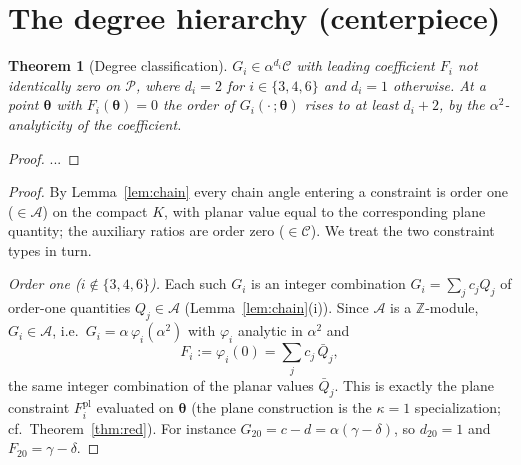 \documentclass[pdflatex,sn-mathphys-num]{sn-jnl}
\theoremstyle{thmstyleone}%
\newtheorem{theorem}{Theorem}%
\theoremstyle{thmstyletwo}%
\theoremstyle{thmstylethree}%
\begin{document}
\section{The degree hierarchy (centerpiece)}
\begin{theorem}[Degree classification]\label{thm:deg}
$G_i\in\alpha^{d_i}\mathcal C$ with leading coefficient $F_i$ not identically zero on $\mathcal P$, where $d_i=2$ for $i\in\{3,4,6\}$ and $d_i=1$ otherwise. At a point $\boldsymbol\theta$ with $F_i(\boldsymbol\theta)=0$ the order of $G_i(\cdot\,;\boldsymbol\theta)$ rises to at least $d_i+2$, by the $\alpha^2$-analyticity of the coefficient.
\end{theorem}
\begin{proof}...\end{proof}
\begin{proof}
By Lemma~\ref{lem:chain} every chain angle entering a constraint is order one
($\in\mathcal A$) on the compact $K$, with planar value equal to the corresponding plane quantity; the auxiliary ratios are order zero ($\in\mathcal C$). We treat the two constraint types in turn.

\emph{Order one ($i\notin\{3,4,6\}$).}
Each such $G_i$ is an integer combination $G_i=\sum_j c_j Q_j$ of order-one quantities $Q_j\in\mathcal A$ (Lemma~\ref{lem:chain}(i)). Since $\mathcal A$ is a $\mathbb Z$-module, $G_i\in\mathcal A$, i.e.\ $G_i=\alpha\,\varphi_i(\alpha^2)$ with $\varphi_i$ analytic in $\alpha^2$ and
\[
  F_i:=\varphi_i(0)=\sum_j c_j\,\bar Q_j,
\]
the same integer combination of the planar values $\bar Q_j$. This is exactly the plane constraint $F_i^{\mathrm{pl}}$ evaluated on $\boldsymbol\theta$ (the plane construction is the $\kappa=1$ specialization; cf.\ Theorem~\ref{thm:red}). For instance $G_{20}=c-d=\alpha(\gamma-\delta)$, so $d_{20}=1$ and $F_{20}=\gamma-\delta$.


\end{proof}
\end{document}
